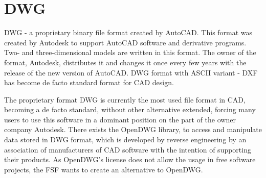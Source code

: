 \documentclass[a4paper, 11pt, article]{report}
\begin{document}
{{   \section{DWG}
   
   DWG - a proprietary binary file format created by AutoCAD.
This format was created by Autodesk to support AutoCAD software and derivative programs. Two- and three-dimensional models are written in this format. The owner of the format, Autodesk, distributes it and changes it once every few years with the release of the new version of AutoCAD.
DWG format with ASCII variant - DXF has become de facto standard format for CAD design.

The proprietary format DWG is currently the most used file format in CAD, becoming a de facto standard, without other alternative extended, forcing many users to use this software in a dominant position on the part of the owner company Autodesk.
There exists the OpenDWG library, to access and manipulate data stored in DWG format, which is developed by reverse engineering by an association of manufacturers of CAD software with the intention of supporting their products. As OpenDWG's license does not allow the usage in free software projects, the FSF wants to create an alternative to OpenDWG.


}}
\end{document}
